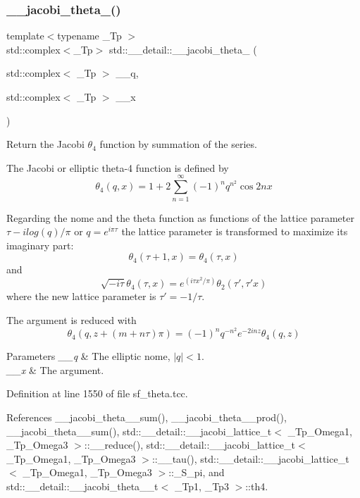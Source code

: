 \subsubsection{\texorpdfstring{\+\_\+\+\_\+jacobi\+\_\+theta\+\_()}{\_\_jacobi\_theta\_4()}\hspace{0.1cm}{\footnotesize\ttfamily [1/2]}}
{\footnotesize\ttfamily template$<$typename \+\_\+\+Tp $>$ \\
std\+::complex$<$\+\_\+\+Tp$>$ std\+::\+\_\+\+\_\+detail\+::\+\_\+\+\_\+jacobi\+\_\+theta\+\_ (\begin{DoxyParamCaption}\item[{std\+::complex$<$ \+\_\+\+Tp $>$}]{\+\_\+\+\_\+q,  }\item[{std\+::complex$<$ \+\_\+\+Tp $>$}]{\+\_\+\+\_\+x }\end{DoxyParamCaption})}

Return the Jacobi $ \theta_4 $ function by summation of the series.

The Jacobi or elliptic theta-\/4 function is defined by \[ \theta_4(q,x) = 1 + 2\sum_{n=1}^{\infty}(-1)^n q^{n^2}\cos{2nx} \]

Regarding the nome and the theta function as functions of the lattice parameter $ \tau -i log(q)/ \pi $ or $ q = e^{i\pi\tau} $ the lattice parameter is transformed to maximize its imaginary part\+: \[ \theta_4(\tau+1,x) = \theta_4(\tau,x) \] and \[ \sqrt{-i\tau}\theta_4(\tau,x) = e^{(i\tau x^2/\pi)}\theta_2(\tau',\tau' x) \] where the new lattice parameter is $ \tau' = -1/\tau $.

The argument is reduced with \[ \theta_4(q, z+(m + n\tau)\pi) = (-1)^n q^{-n^2}e^{-2inz}\theta_4(q, z) \]


\begin{DoxyParams}{Parameters}
{\em \+\_\+\+\_\+q} & The elliptic nome, $ |q| < 1 $. \\
\hline
{\em \+\_\+\+\_\+x} & The argument. \\
\hline
\end{DoxyParams}


Definition at line 1550 of file sf\+\_\+theta.\+tcc.



References \+\_\+\+\_\+jacobi\+\_\+theta\+\_\+\_\+sum(), \+\_\+\+\_\+jacobi\+\_\+theta\+\_\+\_\+prod(), \+\_\+\+\_\+jacobi\+\_\+theta\+\_\+\_\+sum(), std\+::\+\_\+\+\_\+detail\+::\+\_\+\+\_\+jacobi\+\_\+lattice\+\_\+t$<$ \+\_\+\+Tp\+\_\+\+Omega1, \+\_\+\+Tp\+\_\+\+Omega3 $>$\+::\+\_\+\+\_\+reduce(), std\+::\+\_\+\+\_\+detail\+::\+\_\+\+\_\+jacobi\+\_\+lattice\+\_\+t$<$ \+\_\+\+Tp\+\_\+\+Omega1, \+\_\+\+Tp\+\_\+\+Omega3 $>$\+::\+\_\+\+\_\+tau(), std\+::\+\_\+\+\_\+detail\+::\+\_\+\+\_\+jacobi\+\_\+lattice\+\_\+t$<$ \+\_\+\+Tp\+\_\+\+Omega1, \+\_\+\+Tp\+\_\+\+Omega3 $>$\+::\+\_\+\+S\+\_\+pi, and std\+::\+\_\+\+\_\+detail\+::\+\_\+\+\_\+jacobi\+\_\+theta\+\_\+\_\+t$<$ \+\_\+\+Tp1, \+\_\+\+Tp3 $>$\+::th4.



